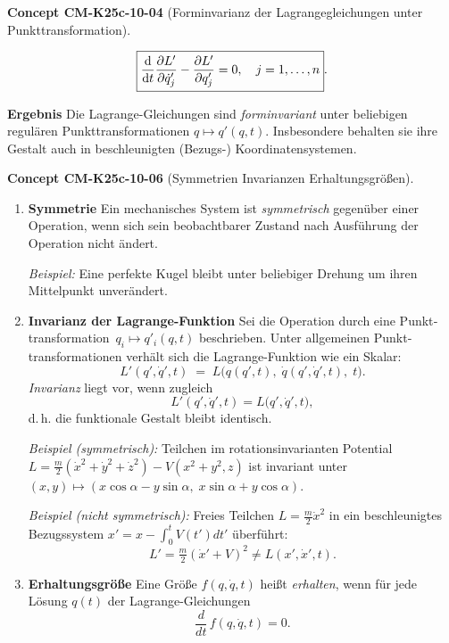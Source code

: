 \documentclass[10pt, letterpaper]{article}
\newcommand{\CustomHeading}[3]{%
  \par\medskip\noindent%
  \textbf{#1 #2} \textnormal{(#3)}.\enskip%
}
\newenvironment{CONC}[2]{\CustomHeading{Concept}{#1}{#2}}{}
\begin{document}
\begin{CONC}{CM-K25c-10-04}{Forminvarianz der Lagrangegleichungen unter Punkttransformation}
\[
  \boxed{%
    \frac{\mathrm d}{\mathrm dt}
      \frac{\partial L'}{\partial\dot q'_j}
    -\frac{\partial L'}{\partial q'_j}=0,
    \quad j=1,\dots,n }.
\]

\textbf{Ergebnis}
Die Lagrange-Gleichungen sind \emph{forminvariant} unter beliebigen
regulären Punkttransformationen
\( q\mapsto q'(q,t) \).
Insbesondere behalten sie ihre Gestalt auch in beschleunigten
(Bezugs-) Koordinatensystemen.
\end{CONC}

\begin{CONC}{CM-K25c-10-06}{Symmetrien Invarianzen Erhaltungsgrößen}
\begin{enumerate}

\item \textbf{Symmetrie}  
Ein mechanisches System ist \emph{symmetrisch} gegenüber einer
Operation, wenn sich sein beobachtbarer Zustand nach Ausführung der
Operation nicht ändert.

\textit{Beispiel:} Eine perfekte Kugel bleibt unter beliebiger
Drehung um ihren Mittelpunkt unverändert.

\item \textbf{Invarianz der Lagrange-Funktion}  
Sei die Operation durch eine Punkt­transformation
$\,q_i\mapsto q'_i(q,t)$ beschrieben.
Unter allgemeinen Punkt­transformationen verhält sich die
Lagrange-Funktion wie ein Skalar:
\[
  L'(q',\dot q',t)
  \;=\;
  L\!\bigl(q(q',t),\;\dot q(q',\dot q',t),\;t\bigr).
\]
\emph{Invarianz} liegt vor, wenn zugleich
\[
  L'(q',\dot q',t)
  =L\!\bigl(q'\!,\dot q',t\bigr),
\]
d.\,h. die funktionale Gestalt bleibt identisch.

\textit{Beispiel (symmetrisch):} Teilchen im rotations­invarianten
Potential  
$L=\tfrac{m}{2}(\dot x^2+\dot y^2+\dot z^2)-V(x^2+y^2,z)$  
ist invariant unter
$(x,y)\mapsto(x\cos\alpha-y\sin\alpha,\;x\sin\alpha+y\cos\alpha)$.

\textit{Beispiel (nicht symmetrisch):}  
Freies Teilchen  
$L=\tfrac{m}{2}\dot x^{2}$
in ein beschleunigtes Bezugs­system  
$x'=x-\!\int_0^t\!V(t')dt'$ überführt:
\[
  L'=\tfrac{m}{2}(\dot x'+V)^{2}\neq L(x'\!,\dot x',t).
\]

\item \textbf{Erhaltungsgröße}  
Eine Größe
$f(q,\dot q,t)$ heißt \emph{erhalten}, wenn für jede Lösung
$q(t)$ der Lagrange-Gleichungen
\[
  \frac{d}{dt}\,f(q,\dot q,t)=0.
\]


\end{enumerate}
\end{CONC}
\end{document}

